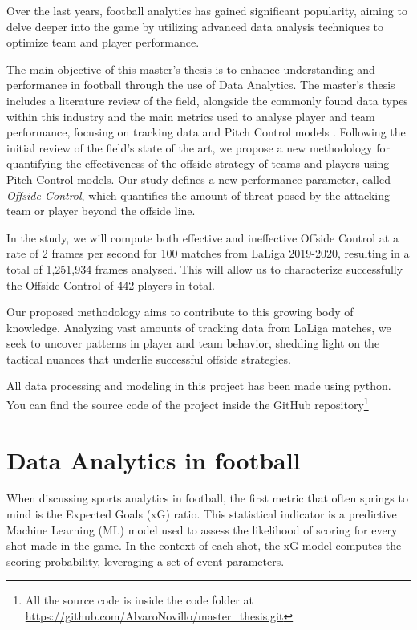 \documentclass[
  twoside,nohyper]{book}
\begin{document}
Over the last years, football analytics has gained significant
popularity, aiming to delve deeper into the game by utilizing advanced
data analysis techniques to optimize team and player performance.

The main objective of this master's thesis is to enhance understanding and performance in football through the use of Data Analytics. The master's thesis includes a literature review of the field, alongside the commonly found data types within this
industry and the main metrics used to analyse player and team performance, focusing on tracking data and Pitch Control models \citep{Spearman}. Following the initial review of the field's state of the art, we propose a new methodology for quantifying the effectiveness of the offside strategy of teams and players using Pitch Control models. Our study defines a new performance parameter, called \emph{Offside Control}, which quantifies the amount of threat posed by the attacking team or player beyond the offside line.

In the study, we will compute both effective and ineffective Offside Control at a rate of 2 frames per second for 100 matches from LaLiga 2019-2020, resulting in a total of 1,251,934 frames analysed. This will allow us to characterize successfully the Offside Control of 442 players in total.

Our proposed methodology aims to contribute to this growing body of knowledge. Analyzing vast amounts of tracking data from LaLiga matches, we seek to uncover patterns in player and team behavior, shedding light on the tactical nuances that underlie successful offside strategies.

All data processing and modeling in this project has been made using python. You can find the source code of the project inside the GitHub repository\footnote{All the source code is inside the code folder at \url{https://github.com/AlvaroNovillo/master_thesis.git}}

\chapter{Data Analytics in football}\label{data-analytics-in-football}

When discussing sports analytics in football, the first metric that
often springs to mind is the Expected Goals (xG) ratio. This statistical
indicator is a predictive Machine Learning (ML) model used to assess the
likelihood of scoring for every shot made in the game. In the context of
each shot, the xG model computes the scoring probability, leveraging a
set of event parameters.
\end{document}
